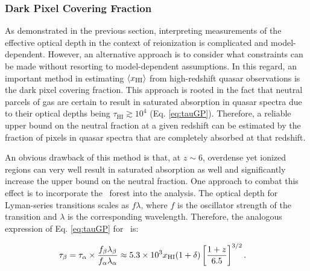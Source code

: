 \subsubsection{Dark Pixel Covering Fraction}

As demonstrated in the previous section, interpreting measurements of the effective optical depth in the context of reionization is complicated and model-dependent. However, an alternative approach is to consider what constraints can be made without resorting to model-dependent assumptions. In this regard, an important method in estimating $\langle x_{\text{HI}}\rangle$ from high-redshift quasar observations is the dark pixel covering fraction. This approach is rooted in the fact that neutral parcels of gas are certain to result in saturated absorption in quasar spectra due to their optical depths being $\tau_{\text{HI}} \gtrsim 10^4$ (Eq. \ref{eq:tauGP}). Therefore, a reliable upper bound on the neutral fraction at a given redshift can be estimated by the fraction of pixels in quasar spectra that are completely absorbed at that redshift. 

An obvious drawback of this method is that, at $z \sim 6$, overdense yet ionized regions can very well result in saturated absorption as well and significantly increase the upper bound on the neutral fraction. One approach to combat this effect is to incorporate the \lyb\ forest into the analysis. The optical depth for Lyman-series transitions scales as $f\lambda$, where $f$ is the oscillator strength of the transition and $\lambda$ is the corresponding wavelength. Therefore, the analogous expression of Eq. \ref{eq:tauGP} for \lyb\ is:

\begin{align}
\tau_{\beta} &= \tau_{\alpha} \times \dfrac{f_{\beta}\lambda_{\beta}}{f_{\alpha}\lambda_{\alpha}} \approx 5.3 \times 10^{3} x_{\text{HI}} (1 + \delta) \left[\dfrac{1+z}{6.5}\right]^{3/2}. \label{eq:tauGPB}
\end{align}

